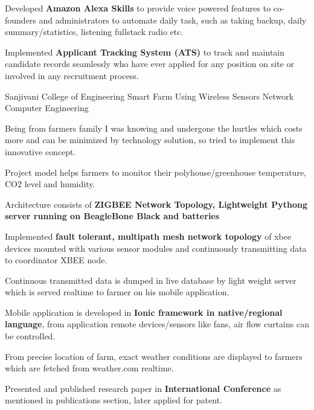 \begin{cventries}
{\begin{cvitems}
        \item {Developed \textbf{Amazon Alexa Skills} to provide voice powered features to co-founders and administrators to automate daily task, such as taking backup, daily summary/statistics, listening fullstack radio etc. }
        \item {Implemented \textbf{Applicant Tracking System (ATS)} to track and maintain candidate records  seamlessly who have ever applied for any position on site or involved in any recruitment process.}
        \\
      \end{cvitems}
    }
    \cventry
    {Sanjivani College of Engineering} %
    {Smart Farm Using Wireless Sensors Network} %
    {Computer Engineering} %
    { } %
    {
      \begin{cvitems} %
        \item {Being from farmers family I was knowing and undergone the hurtles which costs more and can be minimized by technology solution, so tried to implement this innovative concept.}
        \item {Project model helps farmers to monitor their polyhouse/greenhouse temperature, CO2 level and humidity.}
        \item {Architecture consists of \textbf{ZIGBEE Network Topology, Lightweight Pythong server running on BeagleBone Black and batteries}}
        \item {Implemented \textbf{fault tolerant, multipath mesh network topology} of xbee devices mounted with various sensor modules and continuously transmitting data to coordinator XBEE node.}
        \item {Continuous transmitted data is dumped in live database by light weight server which is served realtime to farmer on his mobile application. }
        \item{Mobile application is developed in \textbf{Ionic framework in native/regional language}, from application remote devices/sensors like fans, air flow curtains can be controlled.}
        \item {From precise location of farm, exact weather conditions are displayed to farmers which are fetched from weather.com realtime.}
        \item {Presented and published research paper in \textbf{International Conference} as mentioned in publications section, later applied for patent.}
      \end{cvitems}
    }
\end{cventries}
